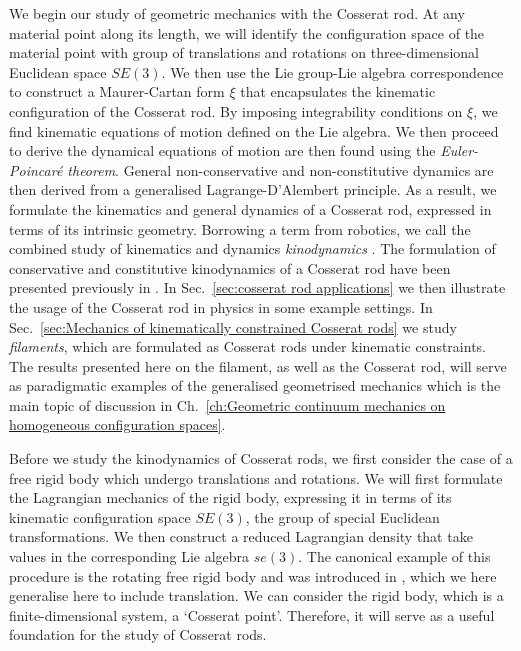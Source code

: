 We begin our study of geometric mechanics with the Cosserat rod. At any material point along its length, we will identify the configuration space of the material point with group of translations and rotations on three-dimensional Euclidean space $SE(3)$. We then use the Lie group-Lie algebra correspondence to construct a Maurer-Cartan form $\xi$ that encapsulates the kinematic configuration of the Cosserat rod. By imposing integrability conditions on $\xi$, we find kinematic equations of motion defined on the Lie algebra. We then proceed to derive the dynamical equations of motion are then found using the \textit{Euler-Poincaré theorem}. General non-conservative and non-constitutive dynamics are then derived from a generalised Lagrange-D'Alembert principle. As a result, we formulate the kinematics and general dynamics of a Cosserat rod, expressed in terms of its intrinsic geometry. Borrowing a term from robotics, we call the combined study of kinematics and dynamics \textit{kinodynamics} \citep{donaldKinodynamicMotionPlanning1993, donaldProvablyGoodApproximation1995}. The formulation of conservative and constitutive kinodynamics of a Cosserat rod have been presented previously in \citep{giusteriSimulationViscoelasticCosserat2021, giusteriImportanceEffectivenessRepresenting}. In Sec.~\ref{sec:cosserat rod applications} we then illustrate the usage of the Cosserat rod in physics in some example settings. In Sec.~\ref{sec:Mechanics of kinematically constrained Cosserat rods} we study \textit{filaments}, which are formulated as Cosserat rods under kinematic constraints. The results presented here on the filament, as well as the Cosserat rod, will serve as paradigmatic examples of the generalised geometrised mechanics which is the main topic of discussion in Ch.~\ref{ch:Geometric continuum mechanics on homogeneous configuration spaces}.

Before we study the kinodynamics of Cosserat rods, we first consider the case of a free rigid body which undergo translations and rotations. We will first formulate the Lagrangian mechanics of the rigid body, expressing it in terms of its kinematic configuration space $SE(3)$, the group of special Euclidean transformations. We then construct a reduced Lagrangian density that take values in the corresponding Lie algebra $\textit{se}(3)$. The canonical example of this procedure is the rotating free rigid body and was introduced in \citep{marsdenIntroductionMechanicsSymmetry2013, holmEulerPoincareEquations1998, cendraLagrangianReductionEuler1999}, which we here generalise here to include translation. We can consider the rigid body, which is a finite-dimensional system, a `Cosserat point'. Therefore, it will serve as a useful foundation for the study of Cosserat rods.

